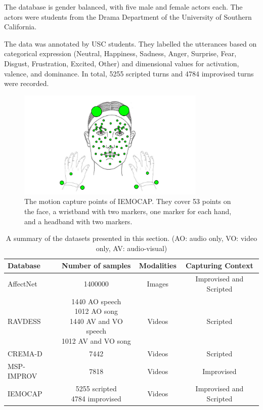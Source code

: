 The database is gender balanced, with five male and female actors each. The actors were students from the Drama Department of the University of Southern California.

The data was annotated by USC students. They labelled the utterances based on categorical expression (Neutral, Happiness, Sadness, Anger, Surprise, Fear, Disgust, Frustration, Excited, Other) and dimensional values for activation, valence, and dominance. In total, 5255 scripted turns and 4784 improvised turns were recorded. 

\begin{figure}
    \centering
    \includegraphics[width=0.8\textwidth]{res/iemocap.png}
    \caption{The motion capture points of IEMOCAP. They cover 53 points on the face, a wristband with two markers, one marker for each hand, and a headband with two markers. \cite{busso2008iemocap}}
    \label{fig:iemocap_cap}
\end{figure}

\begin{table}[h!]
    \centering
    \begin{tabular}{lccc}
    \hline
       \textbf{Database}  & \textbf{Number of samples} & \textbf{Modalities} & \textbf{Capturing Context} \\
    \hline
        AffectNet & 1400000 & Images & Improvised and Scripted \\ \hline
        RAVDESS & \makecell{1440 AO speech \\ 1012 AO song \\ 1440 AV and VO speech \\ 1012 AV and VO song}  & Videos & Scripted \\ \hline
        CREMA-D & 7442  & Videos & Scripted \\ \hline
        MSP-IMPROV & 7818  & Videos & Improvised \\ \hline
        IEMOCAP & \makecell{5255 scripted \\ 4784 improvised}  & Videos & Improvised and Scripted \\ \hline
    \end{tabular}
    \caption{A summary of the datasets presented in this section. (AO: audio only, VO: video only, AV: audio-visual)}
    \label{tab:dataset_summary}
\end{table}

